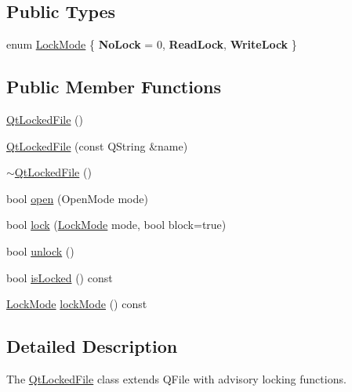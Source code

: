 \subsection*{Public Types}
\begin{DoxyCompactItemize}
\item 
enum \hyperlink{class_qt_l_p___private_1_1_qt_locked_file_ab9a54228983e33cf1fb8dace52141f26}{Lock\+Mode} \{ {\bfseries No\+Lock} = 0, 
{\bfseries Read\+Lock}, 
{\bfseries Write\+Lock}
 \}
\end{DoxyCompactItemize}
\subsection*{Public Member Functions}
\begin{DoxyCompactItemize}
\item 
\hyperlink{class_qt_l_p___private_1_1_qt_locked_file_a69bf1d82b1ca46f97466634d8f9587aa}{Qt\+Locked\+File} ()
\item 
\hyperlink{class_qt_l_p___private_1_1_qt_locked_file_a8b7a228ae02dca4bb99743219d0cdb7b}{Qt\+Locked\+File} (const Q\+String \&name)
\item 
\hyperlink{class_qt_l_p___private_1_1_qt_locked_file_ae22e087171c094da6cfb3282e838c9d4}{$\sim$\+Qt\+Locked\+File} ()
\item 
bool \hyperlink{class_qt_l_p___private_1_1_qt_locked_file_a2e81bbaa7b1aaa83cf79284e66dbad79}{open} (Open\+Mode mode)
\item 
bool \hyperlink{class_qt_l_p___private_1_1_qt_locked_file_af7876c08254a16d00022939f2fb9a8b8}{lock} (\hyperlink{class_qt_l_p___private_1_1_qt_locked_file_ab9a54228983e33cf1fb8dace52141f26}{Lock\+Mode} mode, bool block=true)
\item 
bool \hyperlink{class_qt_l_p___private_1_1_qt_locked_file_abb4d7e6211d9e6e14afaa661818fb2bf}{unlock} ()
\item 
bool \hyperlink{class_qt_l_p___private_1_1_qt_locked_file_ac93115b12ddd6c3275a5a81a94b6c919}{is\+Locked} () const 
\item 
\hyperlink{class_qt_l_p___private_1_1_qt_locked_file_ab9a54228983e33cf1fb8dace52141f26}{Lock\+Mode} \hyperlink{class_qt_l_p___private_1_1_qt_locked_file_aabfd6fb28f249a5fb01f3965de0e41f1}{lock\+Mode} () const 
\end{DoxyCompactItemize}


\subsection{Detailed Description}
The \hyperlink{class_qt_l_p___private_1_1_qt_locked_file}{Qt\+Locked\+File} class extends Q\+File with advisory locking functions. 


